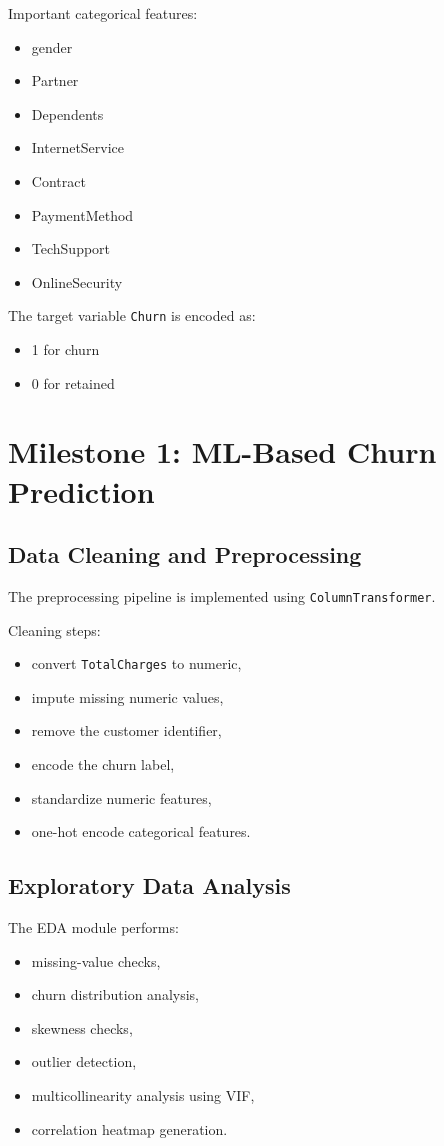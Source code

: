 \documentclass[12pt]{article}
\begin{document}
Important categorical features:
\begin{itemize}
    \item gender
    \item Partner
    \item Dependents
    \item InternetService
    \item Contract
    \item PaymentMethod
    \item TechSupport
    \item OnlineSecurity
\end{itemize}

The target variable \texttt{Churn} is encoded as:
\begin{itemize}
    \item 1 for churn
    \item 0 for retained
\end{itemize}

\section{Milestone 1: ML-Based Churn Prediction}

\subsection{Data Cleaning and Preprocessing}
The preprocessing pipeline is implemented using \texttt{ColumnTransformer}.

Cleaning steps:
\begin{itemize}
    \item convert \texttt{TotalCharges} to numeric,
    \item impute missing numeric values,
    \item remove the customer identifier,
    \item encode the churn label,
    \item standardize numeric features,
    \item one-hot encode categorical features.
\end{itemize}

\subsection{Exploratory Data Analysis}
The EDA module performs:
\begin{itemize}
    \item missing-value checks,
    \item churn distribution analysis,
    \item skewness checks,
    \item outlier detection,
    \item multicollinearity analysis using VIF,
    \item correlation heatmap generation.
\end{itemize}
\end{document}
